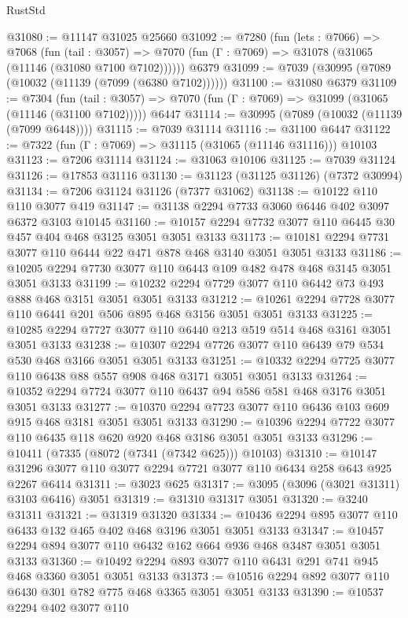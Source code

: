 \begin{lexlean}{RustStd}
\begin{coremodule}
@31080 := @11147 @31025 @25660
@31092 := @7280
    (fun (lets : @7066) =>
    @7068
      (fun (tail : @3057) =>
      @7070 (fun (Γ : @7069) => @31078 (@31065 (@11146 (@31080 @7100 @7102))))))
    @6379
@31099 := @7039 (@30995 (@7089 (@10032 (@11139 (@7099 (@6380 @7102))))))
@31100 := @31080 @6379
@31109 := @7304
    (fun (tail : @3057) => @7070 (fun (Γ : @7069) => @31099 (@31065 (@11146 (@31100 @7102)))))
    @6447
@31114 := @30995 (@7089 (@10032 (@11139 (@7099 @6448))))
@31115 := @7039 @31114
@31116 := @31100 @6447
@31122 := @7322 (fun (Γ : @7069) => @31115 (@31065 (@11146 @31116))) @10103
@31123 := @7206 @31114
@31124 := @31063 @10106
@31125 := @7039 @31124
@31126 := @17853 @31116
@31130 := @31123 (@31125 @31126) (@7372 @30994)
@31134 := @7206 @31124 @31126 (@7377 @31062)
@31138 := @10122 @110 @110 @3077 @419
@31147 := @31138 @2294 @7733 @3060 @6446 @402 @3097 @6372 @3103 @10145
@31160 := @10157 @2294 @7732 @3077 @110 @6445 @30 @457 @404 @468 @3125 @3051 @3051 @3133
@31173 := @10181 @2294 @7731 @3077 @110 @6444 @22 @471 @878 @468 @3140 @3051 @3051 @3133
@31186 := @10205 @2294 @7730 @3077 @110 @6443 @109 @482 @478 @468 @3145 @3051 @3051 @3133
@31199 := @10232 @2294 @7729 @3077 @110 @6442 @73 @493 @888 @468 @3151 @3051 @3051 @3133
@31212 := @10261 @2294 @7728 @3077 @110 @6441 @201 @506 @895 @468 @3156 @3051 @3051 @3133
@31225 := @10285 @2294 @7727 @3077 @110 @6440 @213 @519 @514 @468 @3161 @3051 @3051 @3133
@31238 := @10307 @2294 @7726 @3077 @110 @6439 @79 @534 @530 @468 @3166 @3051 @3051 @3133
@31251 := @10332 @2294 @7725 @3077 @110 @6438 @88 @557 @908 @468 @3171 @3051 @3051 @3133
@31264 := @10352 @2294 @7724 @3077 @110 @6437 @94 @586 @581 @468 @3176 @3051 @3051 @3133
@31277 := @10370 @2294 @7723 @3077 @110 @6436 @103 @609 @915 @468 @3181 @3051 @3051 @3133
@31290 := @10396 @2294 @7722 @3077 @110 @6435 @118 @620 @920 @468 @3186 @3051 @3051 @3133
@31296 := @10411 (@7335 (@8072 (@7341 (@7342 @625))) @10103)
@31310 := @10147 @31296 @3077 @110 @3077 @2294 @7721 @3077 @110 @6434 @258 @643 @925 @2267 @6414
@31311 := @3023 @625
@31317 := @3095 (@3096 (@3021 @31311) @3103 @6416) @3051
@31319 := @31310 @31317 @3051
@31320 := @3240 @31311
@31321 := @31319 @31320
@31334 := @10436 @2294 @895 @3077 @110 @6433 @132 @465 @402 @468 @3196 @3051 @3051 @3133
@31347 := @10457 @2294 @894 @3077 @110 @6432 @162 @664 @936 @468 @3487 @3051 @3051 @3133
@31360 := @10492 @2294 @893 @3077 @110 @6431 @291 @741 @945 @468 @3360 @3051 @3051 @3133
@31373 := @10516 @2294 @892 @3077 @110 @6430 @301 @782 @775 @468 @3365 @3051 @3051 @3133
@31390 := @10537
    @2294
    @402
    @3077
    @110

\end{coremodule}
\end{lexlean}
